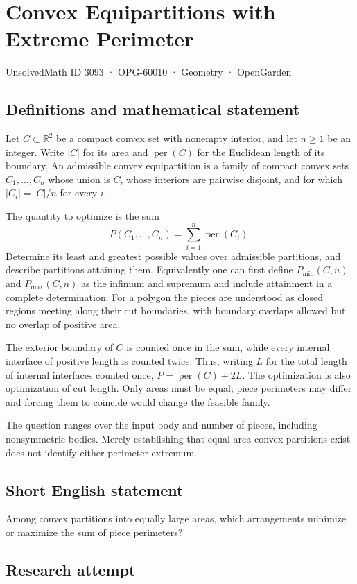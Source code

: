 \documentclass[11pt,a4paper]{article}
\begin{document}
\section*{Convex Equipartitions with Extreme Perimeter}\label{3093}
{\small UnsolvedMath ID 3093 · OPG-60010 · Geometry · OpenGarden}
\subsection{Definitions and mathematical statement}
Let $C\subset\mathbb R^2$ be a compact convex set with nonempty interior,
and let $n\ge1$ be an integer. Write $|C|$ for its area and
$\operatorname{per}(C)$ for the Euclidean length of its boundary.
An admissible convex equipartition is a family of compact convex sets
$C_1,\ldots,C_n$ whose union is $C$, whose interiors are pairwise disjoint,
and for which $|C_i|=|C|/n$ for every $i$.

The quantity to optimize is the sum
\[
 P(C_1,\ldots,C_n)=\sum_{i=1}^n\operatorname{per}(C_i).
\]
Determine its least and greatest possible values over admissible partitions,
and describe partitions attaining them. Equivalently one can first define
$P_{\min}(C,n)$ and $P_{\max}(C,n)$ as the infimum and supremum and
include attainment in a complete determination. For a polygon the pieces
are understood as closed regions meeting along their cut boundaries,
with boundary overlaps allowed but no overlap of positive area.

The exterior boundary of $C$ is counted once in the sum, while every
internal interface of positive length is counted twice. Thus, writing
$L$ for the total length of internal interfaces counted once,
$P=\operatorname{per}(C)+2L$. The optimization is also optimization of
cut length. Only areas must be equal; piece perimeters may differ and
forcing them to coincide would change the feasible family.

The question ranges over the input body and number of pieces, including
nonsymmetric bodies. Merely establishing that equal-area convex partitions
exist does not identify either perimeter extremum.
\subsection{Short English statement}
Among convex partitions into equally large areas, which arrangements minimize or maximize the sum of piece perimeters?
\subsection{Research attempt}
\end{document}
